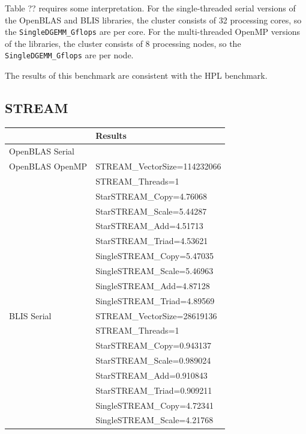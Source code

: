 \documentclass{report}
\begin{document}
Table ?? requires some interpretation. For the single-threaded serial versions of the OpenBLAS and BLIS libraries, the cluster consists of 32 processing cores, so the \verb|SingleDGEMM_Gflops| are per core. For the multi-threaded OpenMP versions of the libraries, the cluster consists of 8 processing nodes, so the \verb|SingleDGEMM_Gflops| are per node.

The results of this benchmark are consistent with the HPL benchmark.


%
%
\subsection{STREAM}

\begin{table}[H]
\begin{center}
\begin{tabular}{ |l|l| } 
\hline
                & Results \\ 
\hline
OpenBLAS Serial & \\ 
\hline
OpenBLAS OpenMP & STREAM\_VectorSize=114232066 \\
                & STREAM\_Threads=1 \\
                & StarSTREAM\_Copy=4.76068 \\
                & StarSTREAM\_Scale=5.44287 \\
                & StarSTREAM\_Add=4.51713 \\
                & StarSTREAM\_Triad=4.53621 \\
                & SingleSTREAM\_Copy=5.47035 \\
                & SingleSTREAM\_Scale=5.46963 \\
                & SingleSTREAM\_Add=4.87128 \\
                & SingleSTREAM\_Triad=4.89569 \\
\hline
BLIS Serial     & STREAM\_VectorSize=28619136 \\
                & STREAM\_Threads=1 \\
                & StarSTREAM\_Copy=0.943137 \\
                & StarSTREAM\_Scale=0.989024 \\
                & StarSTREAM\_Add=0.910843 \\
                & StarSTREAM\_Triad=0.909211 \\
                & SingleSTREAM\_Copy=4.72341 \\
                & SingleSTREAM\_Scale=4.21768 \\

\end{tabular}
\end{center}
\end{table}
\end{document}

